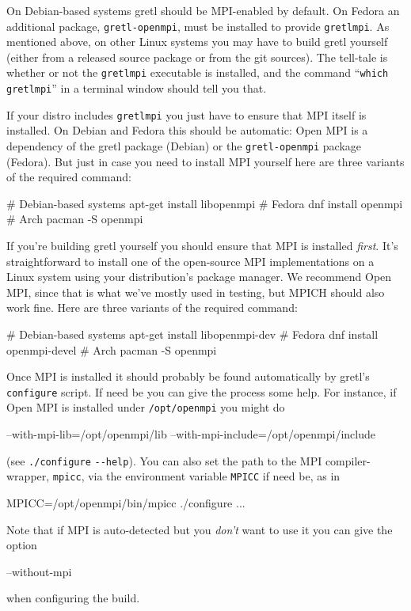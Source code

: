 \documentclass{article}
\begin{document}
On Debian-based systems gretl should be MPI-enabled by default.  On
Fedora an additional package, \texttt{gretl-openmpi}, must be
installed to provide \texttt{gretlmpi}.  As mentioned above, on other
Linux systems you may have to build gretl yourself (either from a
released source package or from the git sources). The tell-tale is
whether or not the \texttt{gretlmpi} executable is installed, and the
command ``\texttt{which gretlmpi}'' in a terminal window should tell
you that.

If your distro includes \texttt{gretlmpi} you just have to ensure that
MPI itself is installed. On Debian and Fedora this should be
automatic: \textsf{Open MPI} is a dependency of the gretl package
(Debian) or the \texttt{gretl-openmpi} package (Fedora). But just in
case you need to install MPI yourself here are three variants of the
required command:
\begin{code}
# Debian-based systems
apt-get install libopenmpi
# Fedora
dnf install openmpi
# Arch
pacman -S openmpi
\end{code}

If you're building gretl yourself you should ensure that MPI is
installed \textit{first}.  It's straightforward to install one of the
open-source MPI implementations on a Linux system using your
distribution's package manager. We recommend \textsf{Open MPI}, since
that is what we've mostly used in testing, but \textsf{MPICH} should
also work fine.  Here are three variants of the required command:
\begin{code}
# Debian-based systems
apt-get install libopenmpi-dev
# Fedora
dnf install openmpi-devel
# Arch
pacman -S openmpi
\end{code}

Once MPI is installed it should probably be found automatically by
gretl's \texttt{configure} script. If need be you can give the process
some help. For instance, if \textsf{Open MPI} is installed under
\texttt{/opt/openmpi} you might do
\begin{code}
--with-mpi-lib=/opt/openmpi/lib
--with-mpi-include=/opt/openmpi/include
\end{code}
(see \texttt{./configure} \verb|--help|). You can also set the path
to the MPI compiler-wrapper, \texttt{mpicc}, via the environment
variable \texttt{MPICC} if need be, as in
\begin{code}
MPICC=/opt/openmpi/bin/mpicc ./configure ...
\end{code}

Note that if MPI is auto-detected but you \emph{don't} want to use it
you can give the option
\begin{code}
--without-mpi
\end{code}
when configuring the build.
\end{document}
